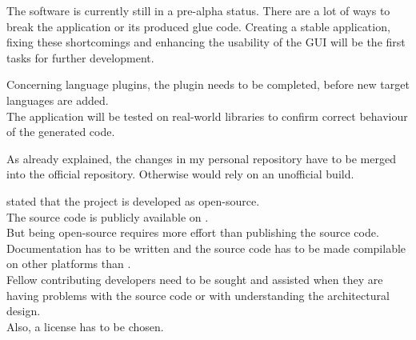 The software is currently still in a pre-alpha status. There are a lot of ways to break the application or its produced glue code. Creating a stable application, fixing these shortcomings and enhancing the usability of the GUI will be the first tasks for further development.

Concerning language plugins, the  plugin needs to be completed, before new target languages are added.\\
The application will be tested on real-world libraries to confirm correct behaviour of the generated code.

As already explained, the changes in my personal  repository have to be merged into the official repository. Otherwise  would rely on an unofficial  build.

 stated that the project is developed as open-source.\\
The source code is publicly available on .\\ But being open-source requires more effort than publishing the source code. Documentation has to be written and the source code has to be made compilable on other platforms than .\\
Fellow contributing developers need to be sought and assisted when they are having problems with the source code or with understanding the architectural design.\\
Also, a license has to be chosen.